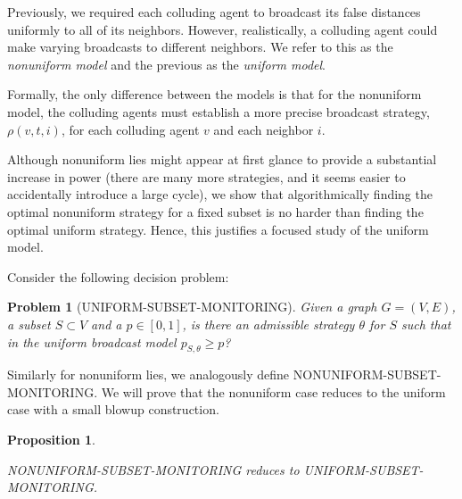 \documentclass[reprint]{revtex4-1}
\newtheorem{problem}{Problem}[section]
\newtheorem{proposition}{Proposition}[section]
\begin{document}
Previously, we required each colluding agent to broadcast its false distances uniformly to all of its neighbors. However, realistically, a colluding agent could make varying broadcasts to different neighbors. We refer to this as the {\it nonuniform model} and the previous as the {\it uniform model}.

Formally, the only difference between the models is that for the nonuniform model, 
the colluding agents must establish a more precise broadcast strategy, $\rho(v,t,i)$, for each colluding agent $v$ and each neighbor $i$. %

Although nonuniform lies might appear at first glance to provide a substantial increase in power (there are many more strategies, and it seems easier to accidentally introduce a large cycle), we show that algorithmically finding the optimal nonuniform strategy for a fixed subset is
no harder than finding the optimal uniform strategy. Hence, this justifies a focused
study of the uniform model.

Consider the following decision problem:
\begin{problem}[UNIFORM-SUBSET-MONITORING]
Given a graph $G = (V,E)$, a subset $S \subset V$ and a $p \in [0,1]$, is there
an admissible strategy $\theta$ for $S$ such that in the uniform broadcast
model $p_{S, \theta} \geq p$?
\end{problem} 
 Similarly for nonuniform lies, we analogously define NONUNIFORM-SUBSET-MONITORING. We will prove that the nonuniform case reduces to the uniform case with a small blowup construction.

\begin{proposition} \label{prop:uniform-reduction}

NONUNIFORM-SUBSET-MONITORING reduces to {{UNIFORM-SUBSET-MONITORING}}.

\end{proposition}


\end{document}
